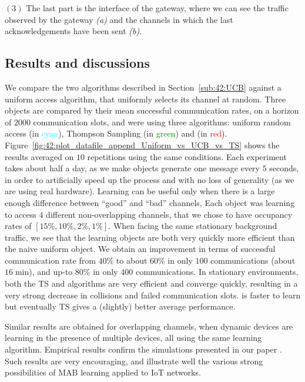 $(3)$ The last part is the interface of the gateway, where we can see the traffic observed by the gateway \emph{(a)} and the channels in which the last acknowledgements have been sent \emph{(b)}.


\subsection{Results and discussions}\label{sec:42:results}

We compare the two algorithms described in Section~\ref{sub:42:UCB} against a uniform access algorithm, that uniformly selects its channel at random.
Three objects are compared by their mean successful communication rates, on a horizon of $2000$ communication slots, and were using three algorithms: uniform random access (in \textcolor{cyan}{cyan}), Thompson Sampling (in \textcolor{green}{green}) and \UCB{} (in \textcolor{red}{red}).
Figure~\ref{fig:42:plot_datafile_append_Uniform_vs_UCB_vs_TS} shows the results averaged on $10$ repetitions using the same conditions.
%
Each experiment takes about half a day,
as we make objects generate one message every $5$ seconds, in order to artificially speed up the process and with no loss of generality (as we are using real hardware).
Learning can be useful only when there is a large enough difference between ``good'' and ``bad'' channels,
Each object was learning to access $4$ different non-overlapping channels, that we chose to have occupancy rates of $[15\%, 10\%, 2\%, 1\%]$.
When facing the same stationary background traffic, we see that the learning objects are both very quickly more efficient than the naive uniform object.
We obtain an improvement in terms of successful communication rate from $40\%$ to about $60\%$ in only $100$ communications (about $16\;\mathrm{min}$), and up-to $80\%$ in only $400$ communications.
%
In stationary environments, both the TS and \UCB{} algorithms are very efficient and converge quickly, resulting in a very strong decrease in collisions and failed communication slots. \UCB{} is faster to learn but eventually TS gives a (slightly) better average performance.

Similar results are obtained for overlapping channels, when dynamic devices are learning in the presence of multiple devices, all using the same learning algorithm.
Empirical results confirm the simulations presented in our paper \cite[Fig.3]{Bonnefoi17}.
Such results are very encouraging, and illustrate well the various strong possibilities of MAB learning applied to IoT networks.


